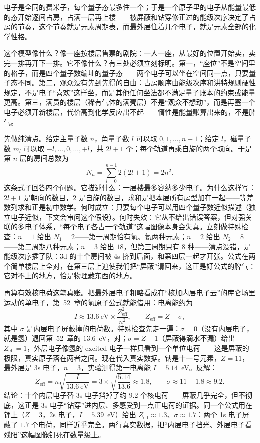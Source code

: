 
\begin{oneline}
电子是全同的费米子，每个量子态最多住一个；于是一个原子里的电子从能量最低的态开始逐间占房，占满一层再上楼——被屏蔽和钻穿修正过的能级次序决定了占房的节奏，这个节奏就是元素周期表，而最外层住着几个电子，就是元素全部的化学性格。
\end{oneline}

这个模型像什么？像一座按楼层售票的剧院：一人一座，从最好的位置开始卖，卖完一排再开下一排。它不像什么？有三处必须立刻标明。第一，“座位”不是空间里的格子，而是四个量子数编址的量子态——两个电子可以坐在空间同一点，只要量子态不同。第二，观众没有先到先得的自由：占房顺序由能级次序和洪特规则硬性规定，不是电子“喜欢”这样坐，而是其他任何坐法都不满足量子账本的约束或能量更高。第三，满员的楼层（稀有气体的满壳层）不是“观众不想动”，而是再塞一个电子必须开新楼层，代价高到化学反应出不起——惰性是能量账算出来的，不是脾气。


先做纯清点。给定主量子数 \(n\)，角量子数 \(l\) 可以取 \(0,1,\dots,n-1\)；给定 \(l\)，磁量子数 \(m_l\) 可以取 \(-l,\dots,0,\dots,+l\)，共 \(2l+1\) 个；每个轨道再乘自旋的两个取向。于是第 \(n\) 层的房间总数为
\[
N_n=\sum_{l=0}^{n-1}2(2l+1)=2n^2 .
\]
这条式子回答四个问题。它描述什么：一层楼最多容纳多少电子。为什么这样写：\(2l+1\) 是朝向的数目，\(2\) 是自旋的数目，求和是把本层所有房型加在一起——等差数列求和正是初中数学。何时成立：只要每个电子可以用四个量子数近似描述（独立电子近似，下文会审问这个假设）。何时失效：它从不给出错误答案，但对强关联的多电子体系，“每个电子各占一个轨道”这幅图像本身会失真。立刻做特殊检查：\(n=1\) 给出 \(N_1=2\)——第一周期恰有氢、氦两种元素；\(n=2\) 给出 \(N_2=8\)——第二周期八种元素；\(n=3\) 给出 \(18\)，但第三周期只有 \(8\) 种——清点没错，是能级次序插了队：3d 的十个房间被 4s 挤到后面，和第四层一起才开张。公式在两个简单楼层上全对，在第三层上迫使我们把“屏蔽”请回来，这正是好公式的脾气：它对不上的地方，恰是物理藏东西的地方。

再算有效核电荷这笔真账。把最外层电子粗略看成在“核加内层电子云”的库仑场里运动的单电子，第~52~章的氢原子公式就能借用：电离能约为
\[
I\approx 13.6\ \text{eV}\times\frac{Z_{\mathrm{eff}}^2}{n^2},
\qquad Z_{\mathrm{eff}}=Z-\sigma ,
\]
其中 \(\sigma\) 是内层电子屏蔽掉的电荷数。特殊检查先走一遍：\(\sigma=0\)（没有内层电子，就是氢）退回第~52~章的 \(13.6\)~eV，对；\(\sigma=Z-1\)（屏蔽得滴水不漏）给出 \(Z_{\mathrm{eff}}=1\)，外层电子像氢的 excited 电子一样只看到一个单位电荷——这是屏蔽的极限，真实原子落在两者之间。现在代入真实数据。钠是十一号元素，\(Z=11\)，最外层是 3s 电子，\(n=3\)，实验测得第一电离能 \(I=5.14\)~eV。反解：
\[
Z_{\mathrm{eff}}=n\sqrt{\frac{I}{13.6\ \text{eV}}}=3\times\sqrt{\frac{5.14}{13.6}}\approx 1.8,
\qquad \sigma\approx 11-1.8\approx 9.2 .
\]
结论：十个内层电子替 3s 电子挡掉了约 \(9.2\) 个核电荷——屏蔽几乎完全，但不彻底，这正是 3s 电子“钻穿”进内层、多感受到一点正电荷的证据。同一个公式用在锂上（\(Z=3\)，2s 电子，\(I=5.39\)~eV）给出 \(Z_{\mathrm{eff}}\approx1.3\)、\(\sigma\approx1.7\)：两个 1s 电子屏蔽了 \(1.7\) 个电荷，同样近乎完全。两行真实数据，把“内层电子挡光、外层电子看残阳”这幅图像钉死在数量级上。


